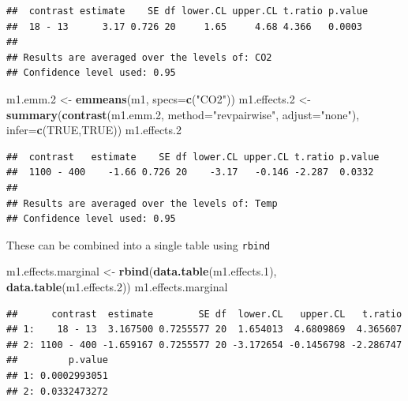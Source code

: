 \documentclass[]{book}
\newenvironment{Shaded}{\begin{snugshade}}{\end{snugshade}}
\newcommand{\DataTypeTok}[1]{\textcolor[rgb]{0.13,0.29,0.53}{#1}}
\newcommand{\FloatTok}[1]{\textcolor[rgb]{0.00,0.00,0.81}{#1}}
\newcommand{\KeywordTok}[1]{\textcolor[rgb]{0.13,0.29,0.53}{\textbf{#1}}}
\newcommand{\NormalTok}[1]{#1}
\newcommand{\OtherTok}[1]{\textcolor[rgb]{0.56,0.35,0.01}{#1}}
\newcommand{\StringTok}[1]{\textcolor[rgb]{0.31,0.60,0.02}{#1}}
\begin{document}
\begin{verbatim}
##  contrast estimate    SE df lower.CL upper.CL t.ratio p.value
##  18 - 13      3.17 0.726 20     1.65     4.68 4.366   0.0003 
## 
## Results are averaged over the levels of: CO2 
## Confidence level used: 0.95
\end{verbatim}

\begin{Shaded}
\begin{Highlighting}[]
\NormalTok{m1.emm}\FloatTok{.2}\NormalTok{ <-}\StringTok{ }\KeywordTok{emmeans}\NormalTok{(m1, }\DataTypeTok{specs=}\KeywordTok{c}\NormalTok{(}\StringTok{"CO2"}\NormalTok{))}
\NormalTok{m1.effects}\FloatTok{.2}\NormalTok{ <-}\StringTok{ }\KeywordTok{summary}\NormalTok{(}\KeywordTok{contrast}\NormalTok{(m1.emm}\FloatTok{.2}\NormalTok{,}
                 \DataTypeTok{method=}\StringTok{"revpairwise"}\NormalTok{,}
                 \DataTypeTok{adjust=}\StringTok{"none"}\NormalTok{),}
        \DataTypeTok{infer=}\KeywordTok{c}\NormalTok{(}\OtherTok{TRUE}\NormalTok{,}\OtherTok{TRUE}\NormalTok{))}
\NormalTok{m1.effects}\FloatTok{.2}
\end{Highlighting}
\end{Shaded}

\begin{verbatim}
##  contrast   estimate    SE df lower.CL upper.CL t.ratio p.value
##  1100 - 400    -1.66 0.726 20    -3.17   -0.146 -2.287  0.0332 
## 
## Results are averaged over the levels of: Temp 
## Confidence level used: 0.95
\end{verbatim}

These can be combined into a single table using \texttt{rbind}

\begin{Shaded}
\begin{Highlighting}[]
\NormalTok{m1.effects.marginal <-}\StringTok{ }\KeywordTok{rbind}\NormalTok{(}\KeywordTok{data.table}\NormalTok{(m1.effects}\FloatTok{.1}\NormalTok{), }\KeywordTok{data.table}\NormalTok{(m1.effects}\FloatTok{.2}\NormalTok{))}
\NormalTok{m1.effects.marginal}
\end{Highlighting}
\end{Shaded}

\begin{verbatim}
##      contrast  estimate        SE df  lower.CL   upper.CL   t.ratio
## 1:    18 - 13  3.167500 0.7255577 20  1.654013  4.6809869  4.365607
## 2: 1100 - 400 -1.659167 0.7255577 20 -3.172654 -0.1456798 -2.286747
##         p.value
## 1: 0.0002993051
## 2: 0.0332473272
\end{verbatim}
\end{document}
